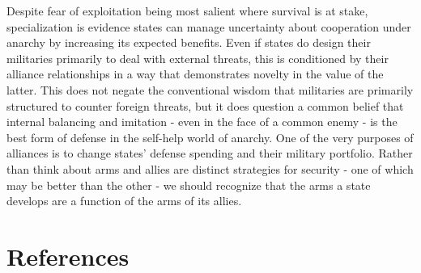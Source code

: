 \documentclass[
  12,
  letterpaper,
  DIV=11,
  numbers=noendperiod]{scrartcl}
\begin{document}
Despite fear of exploitation being most salient where survival is at
stake, specialization is evidence states can manage uncertainty about
cooperation under anarchy by increasing its expected benefits. Even if
states do design their militaries primarily to deal with external
threats, this is conditioned by their alliance relationships in a way
that demonstrates novelty in the value of the latter. This does not
negate the conventional wisdom that militaries are primarily structured
to counter foreign threats, but it does question a common belief that
internal balancing and imitation - even in the face of a common enemy -
is the best form of defense in the self-help world of anarchy. One of
the very purposes of alliances is to change states' defense spending and
their military portfolio. Rather than think about arms and allies are
distinct strategies for security - one of which may be better than the
other - we should recognize that the arms a state develops are a
function of the arms of its allies.

\newpage

\hypertarget{references}{%
\section*{References}\label{references}}
\end{document}
